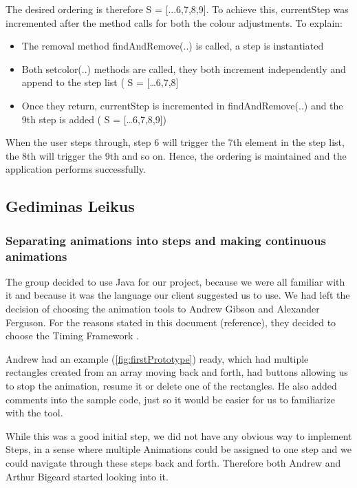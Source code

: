 \documentclass{l3proj}
\begin{document}
The desired ordering is therefore S  = [...6,7,8,9]. To achieve this, currentStep was incremented after the method calls for both the colour adjustments. To explain:
\begin{itemize}
\item The removal method findAndRemove(..) is called, a step is instantiated
\item Both setcolor(..) methods are called, they both increment independently and append to the step list ( S = […6,7,8]
\item Once they return, currentStep is incremented in findAndRemove(..) and the 9th step is added ( S = […6,7,8,9])
\end{itemize}

When the user steps through, step 6 will trigger the 7th  element in the step list, the 8th will trigger the 9th and so on. Hence, the ordering is maintained and the application performs successfully.

\subsection{Gediminas Leikus}
\label{Gediminas:PE}
\subsubsection{Separating animations into steps and making continuous animations}

The group decided to use Java for our project, because we were all familiar with it and because it was the language our client suggested us to use. We had left the decision of choosing the animation tools to Andrew Gibson and Alexander Ferguson. For the reasons stated in this document (reference), they decided to choose the Timing Framework \cite{website:TimingFramework}.

Andrew had an example (\ref{fig:firstPrototype}) ready, which had multiple rectangles created from an array moving back and forth, had buttons allowing us to stop the animation, resume it or delete one of the rectangles. He also added comments into the sample code, just so it would be easier for us to familiarize with the tool.



While this was a good initial step, we did not have any obvious way to implement Steps, in a sense where multiple Animations could be assigned to one step and we could navigate through these steps back and forth. Therefore both Andrew and Arthur Bigeard started looking into it.
\end{document}
